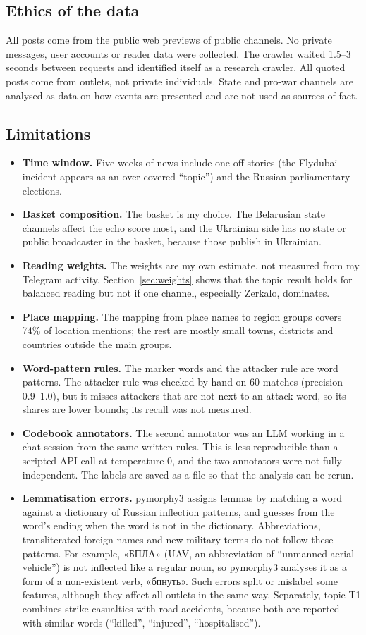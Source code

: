 \documentclass[11pt,a4paper]{article}
\newcommand{\ru}[2]{«#1» (#2)}
\begin{document}
\subsection{Ethics of the data}
All posts come from the public web previews of public channels. No private messages, user accounts or reader data were collected. The crawler waited 1.5--3 seconds between requests and identified itself as a research crawler. All quoted posts come from outlets, not private individuals. State and pro-war channels are analysed as data on how events are presented and are not used as sources of fact.

\subsection{Limitations}
\begin{itemize}
\item \textbf{Time window.} Five weeks of news include one-off stories (the Flydubai incident appears as an over-covered ``topic'') and the Russian parliamentary elections.
\item \textbf{Basket composition.} The basket is my choice. The Belarusian state channels affect the echo score most, and the Ukrainian side has no state or public broadcaster in the basket, because those publish in Ukrainian.
\item \textbf{Reading weights.} The weights are my own estimate, not measured from my Telegram activity. Section~\ref{sec:weights} shows that the topic result holds for balanced reading but not if one channel, especially Zerkalo, dominates.
\item \textbf{Place mapping.} The mapping from place names to region groups covers 74\% of location mentions; the rest are mostly small towns, districts and countries outside the main groups.
\item \textbf{Word-pattern rules.} The marker words and the attacker rule are word patterns. The attacker rule was checked by hand on 60 matches (precision 0.9--1.0), but it misses attackers that are not next to an attack word, so its shares are lower bounds; its recall was not measured.
\item \textbf{Codebook annotators.} The second annotator was an LLM working in a chat session from the same written rules. This is less reproducible than a scripted API call at temperature 0, and the two annotators were not fully independent. The labels are saved as a file so that the analysis can be rerun.
\item \textbf{Lemmatisation errors.} pymorphy3 assigns lemmas by matching a word against a dictionary of Russian inflection patterns, and guesses from the word's ending when the word is not in the dictionary. Abbreviations, transliterated foreign names and new military terms do not follow these patterns. For example, \ru{БПЛА}{UAV, an abbreviation of ``unmanned aerial vehicle''} is not inflected like a regular noun, so pymorphy3 analyses it as a form of a non-existent verb, «бпнуть». Such errors split or mislabel some features, although they affect all outlets in the same way. Separately, topic T1 combines strike casualties with road accidents, because both are reported with similar words (``killed'', ``injured'', ``hospitalised'').

\end{itemize}
\end{document}
